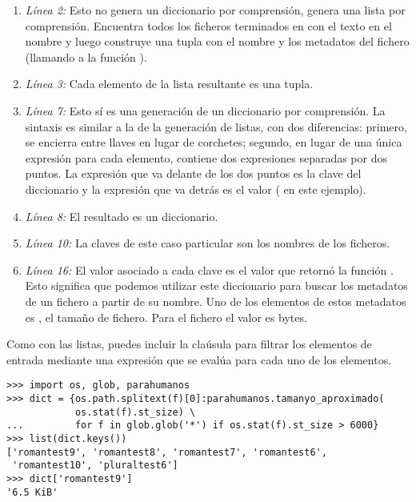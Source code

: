 \begin{enumerate}

\item \emph{Línea 2:} Esto no genera un diccionario por comprensión, genera una lista por comprensión. Encuentra todos los ficheros terminados en  con el texto  en el nombre y luego construye una tupla con el nombre y los metadatos del fichero (llamando a la función ).

\item \emph{Línea 3:} Cada elemento de la lista resultante es una tupla.

\item \emph{Línea 7:} Esto sí es una generación de un diccionario por comprensión. La sintaxis es similar a la de la generación de listas, con dos diferencias: primero, se encierra entre llaves en lugar de corchetes; segundo, en lugar de una única expresión para cada elemento, contiene dos expresiones separadas por dos puntos. La expresión que va delante de los dos puntos es la clave del diccionario y la expresión que va detrás es el valor ( en este ejemplo).

\item \emph{Línea 8:} El resultado es un diccionario.

\item \emph{Línea 10:} La claves de este caso particular son los nombres de los ficheros.

\item \emph{Línea 16:} El valor asociado a cada clave es el valor que retornó la función . Esto significa que podemos utilizar este diccionario para buscar los metadatos de un fichero a partir de su nombre. Uno de los elementos de estos metadatos es , el tamaño de fichero. Para el fichero  el valor es  bytes.

\end{enumerate}

Como con las listas, puedes incluir la claúsula  para filtrar los elementos de entrada mediante una expresión que se evalúa para cada uno de los elementos.

\noindent\begin{minipage}{\textwidth}
\begin{lstlisting}[mathescape=True]
>>> import os, glob, parahumanos
>>> dict = {os.path.splitext(f)[0]:parahumanos.tamanyo_aproximado(
            os.stat(f).st_size) \     
...         for f in glob.glob('*') if os.stat(f).st_size > 6000}
>>> list(dict.keys())
['romantest9', 'romantest8', 'romantest7', 'romantest6', 
 'romantest10', 'pluraltest6']
>>> dict['romantest9']
'6.5 KiB'
\end{lstlisting}
\end{minipage}

